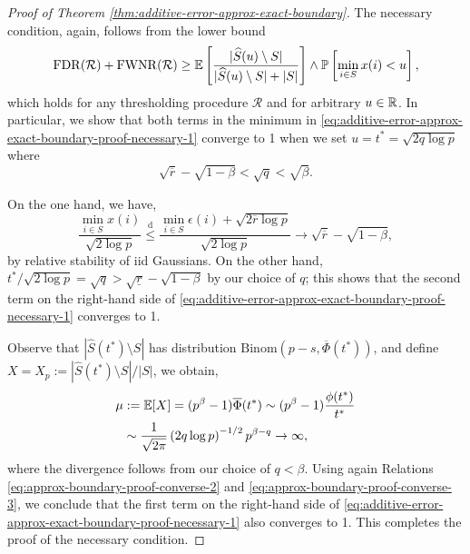 \begin{proof}[Proof of Theorem \ref{thm:additive-error-approx-exact-boundary}]
The necessary condition, again, follows from the lower bound
\begin{equation} \label{eq:additive-error-approx-exact-boundary-proof-necessary-1}
    \mathrm{FDR}(\mathcal{R}) + \mathrm{FWNR}(\mathcal{R}) \ge \E\left[\frac{|\widehat{S}(u)\setminus S|}{|\widehat{S}(u)\setminus S| + |S|}\right] \wedge 
    \P\left[\min_{i\in S}x(i)<u\right],
\end{equation}
which holds for any thresholding procedure $\mathcal{R}$ and for arbitrary $u\in\mathbb R$.
In particular, we show that both terms in the minimum in \eqref{eq:additive-error-approx-exact-boundary-proof-necessary-1} converge to 1 when we set $u=t^*=\sqrt{2q\log{p}}$ where 
\begin{equation}
\sqrt{\overline{r}}-\sqrt{1-\beta}<\sqrt{q}<\sqrt{\beta}.
\end{equation}

On the one hand, we have,
$$
\frac{\min_{i\in S}x(i)}{\sqrt{2\log{p}}} 
\stackrel{\mathrm{d}}{\le} \frac{\min_{i\in S}\epsilon(i)+\sqrt{2\overline{r}\log{p}}}{\sqrt{2\log{p}}} 
\to \sqrt{\overline{r}}-\sqrt{1-\beta},
$$
by relative stability of iid Gaussians. On the other hand, ${t^*}/{\sqrt{2\log{p}}}=\sqrt{q}>\sqrt{\underline{r}}-\sqrt{1-\beta}$ by our choice of ${q}$;
this shows that the second term on the right-hand side of \eqref{eq:additive-error-approx-exact-boundary-proof-necessary-1} converges to 1.

Observe that $|\widehat{S}(t^*)\setminus{S}|$ has distribution $\text{Binom}(p-s, \overline{\Phi}(t^*))$, and define $X = X_p := {|\widehat{S}(t^*)\setminus{S}|}/{|S|}$, we obtain,
\begin{align*}
    \mu &:= \E[X] = (p^\beta-1)\overline{\Phi}(t^*) 
    \sim (p^\beta-1)\frac{\phi(t^*)}{t^*} \\
    &\sim \frac{1}{\sqrt{2\pi}}\left(2q\log{p}\right)^{-1/2}p^{\beta-q}\to\infty,
\end{align*}
where the divergence follows from our choice of $q<\beta$.
Using again Relations \eqref{eq:approx-boundary-proof-converse-2} and \eqref{eq:approx-boundary-proof-converse-3}, we conclude that the first term on the right-hand side of \eqref{eq:additive-error-approx-exact-boundary-proof-necessary-1} also converges to 1.
This completes the proof of the necessary condition.
\end{proof}

















